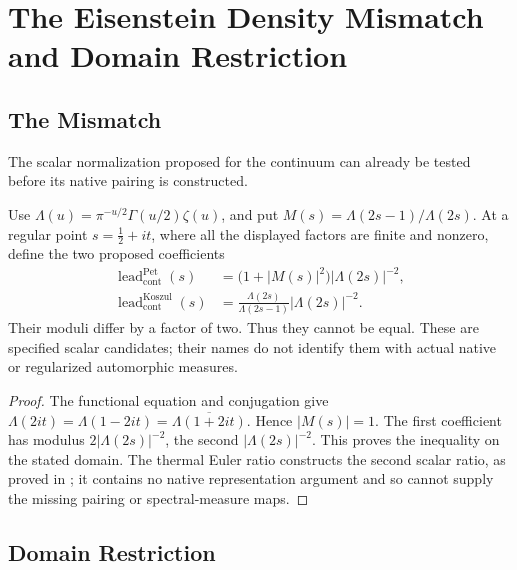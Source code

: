 \section{The Eisenstein Density Mismatch and Domain Restriction}
\label{v4-arith:w5-c:eisenstein}

\subsection{The Mismatch}
\label{v4-arith:w5-c:eisenstein:mismatch}

The scalar normalization proposed for the continuum can already be
tested before its native pairing is constructed.

\begin{proposition}
\label{v4-arith:w5-c:prop:mismatch}
Use \(\Lambda(u)=\pi^{-u/2}\Gamma(u/2)\zeta(u)\), and put
\(M(s)=\Lambda(2s-1)/\Lambda(2s)\).
At a regular point \(s=\tfrac12+it\), where all the displayed
factors are finite and nonzero, define the two proposed coefficients
\begin{align}
\label{v4-arith:w5-c:eq:Pet-density}
\operatorname{lead}^{\mathrm{Pet}}_{\mathrm{cont}}(s)
 &=\bigl(1+|M(s)|^2\bigr)|\Lambda(2s)|^{-2},\\
\label{v4-arith:w5-c:eq:Koszul-density}
\operatorname{lead}^{\mathrm{Koszul}}_{\mathrm{cont}}(s)
 &=\frac{\Lambda(2s)}{\Lambda(2s-1)}|\Lambda(2s)|^{-2}.
\end{align}
Their moduli differ by a factor of two. Thus they cannot be equal.
These are specified scalar candidates; their names do not identify
them with actual native or regularized automorphic measures.
\end{proposition}

\begin{proof}
The functional equation and conjugation give
\(\Lambda(2it)=\Lambda(1-2it)=\overline{\Lambda(1+2it)}\).
Hence \(|M(s)|=1\). The first coefficient has modulus
\(2|\Lambda(2s)|^{-2}\), the second
\(|\Lambda(2s)|^{-2}\). This proves the inequality on the stated
domain. The thermal Euler ratio constructs the second scalar ratio,
as proved in ; it contains
no native representation argument and so cannot supply the missing
pairing or spectral-measure maps.
\end{proof}

\subsection{Domain Restriction}
\label{v4-arith:w5-c:eisenstein:domain}


